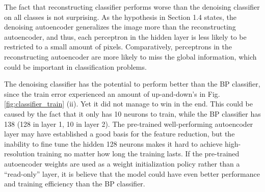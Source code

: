 \documentclass[11pt,titlepage]{article}
\begin{document}
The fact that reconstructing classifier performs worse than the denoising classifier on all classes is not surprising. As the hypothesis in Section 1.4 states, the denoising autoencoder generalizes the image more than the reconstructing autoencoder, and thus, each perceptron in the hidden layer is less likely to be restricted to a small amount of pixels. Comparatively, perceptrons in the reconstructing autoencoder are more likely to miss the global information, which could be important in classification problems.

The denoising classifier has the potential to perform better than the BP classifier, since the train error experienced an amount of up-and-down's in Fig. \ref{fig:classifier_train} (ii). Yet it did not manage to win in the end. This could be caused by the fact that it only has 10 neurons to train, while the BP classifier has 138 (128 in layer 1, 10 in layer 2). The pre-trained well-performing autoencoder layer may have established a good basis for the feature reduction, but the inability to fine tune the hidden 128 neurons makes it hard to achieve high-resolution training no matter how long the training lasts. If the pre-trained autoencoder weights are used as a weight initialization policy rather than a ``read-only'' layer, it is believe that the model could have even better performance and training efficiency than the BP classifier.







\vfill


\end{document}
